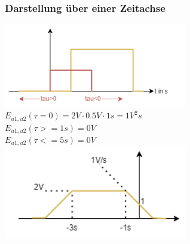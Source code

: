 \documentclass{article}
\begin{document}
\subsubsection*{Darstellung über einer Zeitachse}
\includegraphics[width=0.6\textwidth]{img/2024_11_27_kreuzkorrelation.png} \\
$E_{u1,u2}(\tau = 0) = 2V \cdot 0.5V \cdot 1s = 1V^2s$ \\
$E_{u1,u2}(\tau >= 1s) = 0V$ \\
$E_{u1,u2}(\tau <= 5s) = 0V$ \\
\includegraphics[width=0.6\textwidth]{img/2024_11_27_kreuzkorrelation_multiplikation.png}
\end{document}
